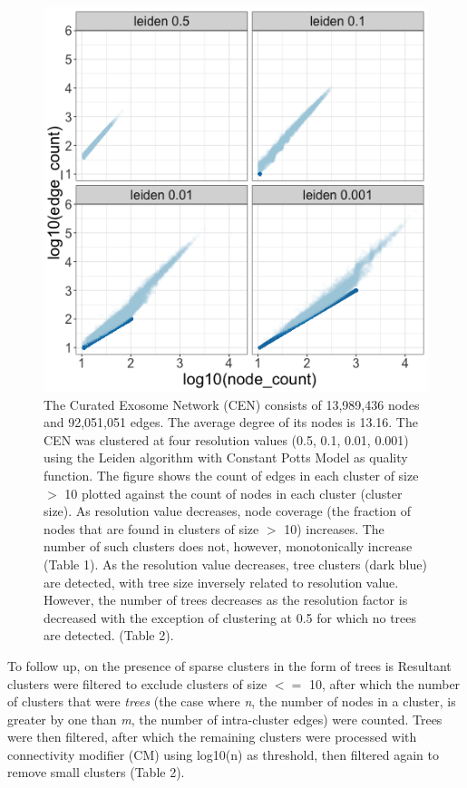 \documentclass[12pt, oneside]{article}   	%
\begin{document}
\begin{figure}[H]
\centering
\includegraphics[width=0.7\linewidth]{cen_quad_fig1.png}
\caption{The Curated Exosome Network (CEN) consists of 13,989,436 nodes and 92,051,051 edges. The average degree of its nodes is 13.16. The CEN was clustered at four resolution values (0.5, 0.1, 0.01, 0.001) using the Leiden algorithm with Constant Potts Model as quality function. The figure shows the count of edges in each cluster of size $>$  10 plotted against the count of nodes in each cluster (cluster size). As resolution value decreases, node coverage (the fraction of nodes that are found in clusters of size $>$  10) increases. The number of such clusters does not, however, monotonically increase (Table 1). As the resolution value decreases, tree clusters (dark blue) are detected, with tree size inversely related to resolution value. However, the number of trees decreases as the resolution factor is decreased with the exception of clustering at 0.5 for which no trees are detected. (Table 2).}
\end{figure}

To follow up, on the presence of sparse clusters in the form of trees is
Resultant clusters were filtered to exclude clusters of size $<=$ 10, after which the number of clusters that were \emph{trees} (the case where \emph{n}, the number of nodes in a cluster, is greater by one than \emph{m}, the number of intra-cluster edges) were counted. Trees were then filtered, after which the remaining clusters were processed with connectivity modifier (CM) using log10(n) as threshold, then filtered again to remove small clusters (Table 2).

\end{document}
